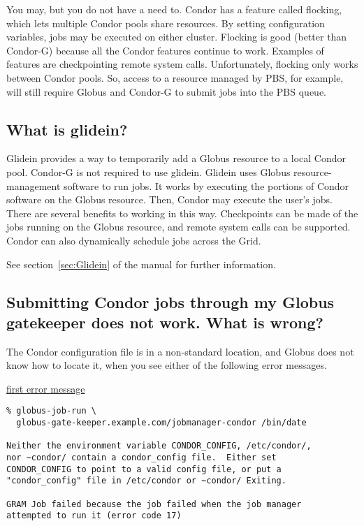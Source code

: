 You may, but you do not have a need to.
Condor has a feature called flocking,
which lets multiple Condor pools share resources.
By setting configuration variables, jobs may be executed on
either cluster.
Flocking is good (better than Condor-G) because
all the Condor features continue to work.
Examples of features are
checkpointing remote system calls.
Unfortunately, flocking only works between Condor pools.
So, access to a resource managed by PBS, for example,
will still require Globus and Condor-G to submit jobs into the PBS queue.

\subsection*{What is glidein?}

Glidein provides a way to temporarily add a Globus resource
to a local Condor pool.
Condor-G is not required to use glidein.
Glidein uses Globus resource-management software to run jobs.
It works by executing the portions of Condor
software on the Globus resource.
Then, Condor may execute the user's jobs.
There are several benefits to working in this way.
Checkpoints can be made of the jobs running on the Globus resource,
and remote system calls can be supported.
Condor can also dynamically schedule jobs across the Grid.

See section~\ref{sec:Glidein} of the manual
for further information.


\subsection*{Submitting Condor jobs through my Globus gatekeeper does not work.  What is wrong?}

The Condor configuration file is in a non-standard location,
and Globus does not know how to locate it, when you see either of the
following error messages.

\underline{first error message}
\begin{verbatim}
% globus-job-run \
  globus-gate-keeper.example.com/jobmanager-condor /bin/date

Neither the environment variable CONDOR_CONFIG, /etc/condor/,
nor ~condor/ contain a condor_config file.  Either set
CONDOR_CONFIG to point to a valid config file, or put a
"condor_config" file in /etc/condor or ~condor/ Exiting.

GRAM Job failed because the job failed when the job manager
attempted to run it (error code 17)
\end{verbatim}

